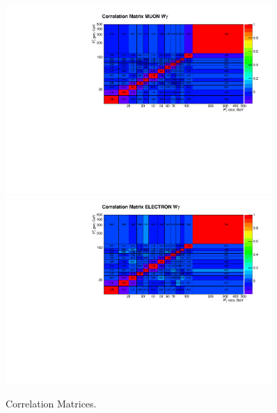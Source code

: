 \begin{figure}[htb]
  \begin{center}
   \includegraphics[width=0.90\textwidth]{../figs/figs_v11/MUON_WGamma/Constants/matrCorrelation_yield_pm_stat.pdf}\\
\includegraphics[width=0.90\textwidth]{../figs/figs_v11/ELECTRON_WGamma/Constants/matrCorrelation_yield_pm_stat.pdf}
  \caption{Correlation Matrices.}
  \label{fig:corrMatrices_Wg}
  \end{center}
\end{figure}



